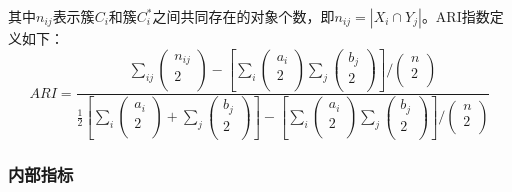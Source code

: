 其中$n_{ij}$表示簇$C_{i}$和簇$C_{i}^{*}$之间共同存在的对象个数，即$n_{i j}=\left|X_{i} \cap Y_{j}\right|$。ARI指数定义如下：
\begin{equation}
\label{ARI}
ARI=\frac{\sum_{ij}{\left( \begin{array}{c}
	n_{ij}\\
	2\\
\end{array} \right)}-\left[ \sum_i{\left( \begin{array}{c}
	a_i\\
	2\\
\end{array} \right)}\sum_j{\left( \begin{array}{c}
	b_j\\
	2\\
\end{array} \right)} \right] /\left( \begin{array}{c}
	n\\
	2\\
\end{array} \right)}{\frac{1}{2}\left[ \sum_i{\left( \begin{array}{c}
	a_i\\
	2\\
\end{array} \right)}+\sum_j{\left( \begin{array}{c}
	b_j\\
	2\\
\end{array} \right)} \right] -\left[ \sum_i{\left( \begin{array}{c}
	a_i\\
	2\\
\end{array} \right)}\sum_j{\left( \begin{array}{c}
	b_j\\
	2\\
\end{array} \right)} \right] /\left( \begin{array}{c}
	n\\
	2\\
\end{array} \right)}
\end{equation}


\subsubsection{内部指标}

